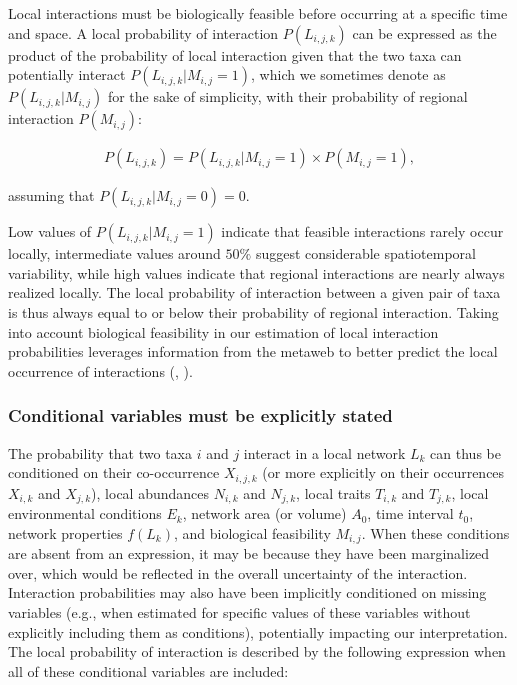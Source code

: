 Local interactions must be biologically feasible before occurring at a specific
time and space. A local probability of interaction $P(L_{i, j, k})$ can be
expressed as the product of the probability of local interaction given that the
two taxa can potentially interact $P(L_{i, j, k} | M_{i, j} = 1)$, which we
sometimes denote as $P(L_{i, j, k}|M_{i, j})$ for the sake of simplicity, with
their probability of regional interaction $P(M_{i, j})$: 

\begin{eqnarray}
  \label{eq:local_meta}
  P(L_{i, j, k}) = P(L_{i, j, k} | M_{i, j} = 1) \times P(M_{i, j} = 1),
\end{eqnarray}

assuming that $P(L_{i,j,k} | M_{i,j } =0) = 0$.

Low values of $P(L_{i, j, k} | M_{i, j} = 1)$ indicate that feasible interactions
rarely occur locally, intermediate values around $50\%$ suggest considerable
spatiotemporal variability, while high values indicate that regional
interactions are nearly always realized locally. The local probability of
interaction between a given pair of taxa is thus always equal to or below their
probability of regional interaction. Taking into account biological feasibility
in our estimation of local interaction probabilities leverages information from
the metaweb to better predict the local occurrence of interactions
(\cite{Strydom2021Roadmapa}, \cite{Dansereau2024Spatially}).  

\subsubsection{Conditional variables must be explicitly stated} 

The probability that two taxa $i$ and $j$ interact in a local network $L_k$ can
thus be conditioned on their co-occurrence $X_{i,j,k}$ (or more explicitly on
their occurrences $X_{i,k}$ and $X_{j,k}$), local abundances $N_{i,k}$ and
$N_{j,k}$, local traits $T_{i,k}$ and $T_{j,k}$, local environmental conditions
$E_k$, network area (or volume) $A_0$, time interval $t_0$, network properties
$f(L_k)$, and biological feasibility $M_{i, j}$. When these conditions are
absent from an expression, it may be because they have been marginalized over,
which would be reflected in the overall uncertainty of the interaction.
Interaction probabilities may also have been implicitly conditioned on missing
variables (e.g., when estimated for specific values of these variables without
explicitly including them as conditions), potentially impacting our
interpretation. The local probability of interaction is described by the
following expression when all of these conditional variables are included:

